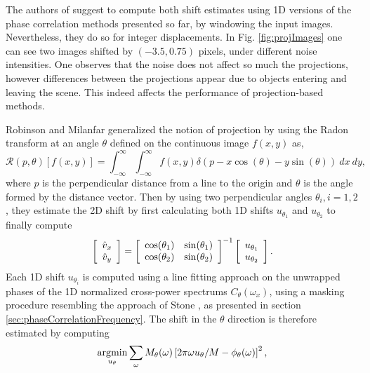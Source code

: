 The authors of \cite{Alliney_86} suggest to compute both shift estimates using 1D versions of the phase correlation methods presented so far, by windowing the input images. Nevertheless, they do so for integer displacements. In Fig. \ref{fig:projImages} one can see two images shifted by $(-3.5, 0.75)$ pixels, under different noise intensities. One observes that the noise does not affect so much the projections, however differences between the projections appear due to objects entering and leaving the scene. This indeed affects the performance of projection-based methods.

Robinson and Milanfar  \cite{Robinson_2001} generalized the notion of projection by using the Radon transform at an angle $\theta$ defined on the continuous image $f(x,y)$ as, 
\begin{equation}
	\mathcal{R}(p, \theta)[f(x,y)] = \int_{-\infty}^{\infty} \int_{-\infty}^{\infty} f(x,y) \delta(p - x \cos(\theta) - y \sin(\theta)) \ dx \ dy,
\end{equation}
where $p$ is the perpendicular distance from a line to the origin and $\theta$ is the angle formed by the distance vector. Then by using two perpendicular angles $\theta_i, i=1,2$, they estimate the 2D shift by first calculating both 1D shifts $u_{\theta_1}$ and $u_{\theta_2}$ to finally compute
\begin{equation}
	\left[
	\begin{array}{c}
		\hat{v}_x \\
		\hat{v}_y
	\end{array}
	\right] = 
	\left[
	\begin{array}{ c c }
		\cos(\theta_1) & \sin(\theta_1) \\
		\cos(\theta_2) & \sin(\theta_2)
	\end{array}
	\right]^{-1}
	\left[
	\begin{array}{c}
		u_{\theta_1} \\
		u_{\theta_2}
	\end{array}
	\right].
\end{equation}
Each 1D shift $u_{\theta_i}$ is computed using a line fitting approach on the unwrapped phases of the 1D normalized cross-power spectrums $C_\theta(\omega_x)$, using a masking procedure resembling the approach of Stone \cite{Stone_2001}, as presented in section \ref{sec:phaseCorrelationFrequency}. The shift in the $\theta$ direction is therefore estimated by computing
\begin{equation}
	\operatorname*{\arg\!\min}_{u_\theta} \sum_{\omega} M_{\theta}(\omega) \left[2 \pi \omega u_{\theta}/M - \phi_\theta(\omega)\right]^2,
\end{equation}

